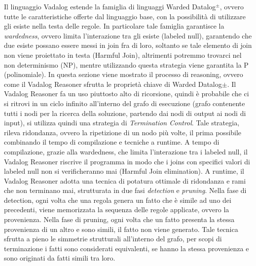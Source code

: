 Il linguaggio Vadalog estende la famiglia di linguaggi Warded Datalog$^\pm $, ovvero tutte le caratteristiche offerte dal linguaggio base, con la possibilità di utilizzare gli esiste nella testa delle regole. \newline
In particolare tale famiglia garantisce la \textit{wardedness}, ovvero limita l'interazione tra gli esiste (labeled null), garantendo che due esiste possano essere messi in join fra di loro, soltanto se tale elemento di join non viene proiettato in testa (Harmful Join), altrimenti potremmo trovarci nel non determinismo (NP), mentre utilizzando questa strategia viene garantita la P  (polinomiale).\newline \newline
In questa sezione viene mostrato il processo di reasoning, ovvero come il Vadalog Reasoner sfrutta le proprietà chiave di Warded Datalog$\pm$. \newline
Il Vadalog Reasoner fa un uso piuttosto alto di ricorsione, quindi è probabile che ci si ritrovi in un ciclo infinito all'interno del grafo di esecuzione (grafo contenente tutti i nodi per la ricerca della soluzione, partendo dai nodi di output ai nodi di input), si utilizza quindi una strategia di \textit{Termination Control}. \newline
Tale strategia, rileva ridondanza, ovvero la ripetizione di un nodo più volte, il prima possibile combinando il tempo di compilazione e tecniche a runtime. \newline
A tempo di compilazione, grazie alla wardedness, che limita l'interazione tra i labeled null, il Vadalog Reasoner riscrive il programma in modo che i joins con specifici valori di labeled null non si verificheranno mai (Harmful Join elimination). \newline
A runtime, il Vadalog Reasoner adotta una tecnica di potatura ottimale di ridondanza e rami che non terminano mai, strutturata in due fasi \emph{detection} e \emph{pruning}. \newline
Nella fase di detection, ogni volta che una regola genera un fatto che è simile ad uno dei precedenti, viene memorizzata la sequenza delle regole applicate, ovvero la provenienza. \newline
Nella fase di pruning, ogni volta che un fatto presenta la stessa provenienza di un altro e sono simili, il fatto non viene generato. \newline
Tale tecnica sfrutta a pieno le simmetrie strutturali all'interno del grafo, per scopi di terminazione i fatti sono considerati equivalenti, se hanno la stessa provenienza e sono originati da fatti simili tra loro. 


